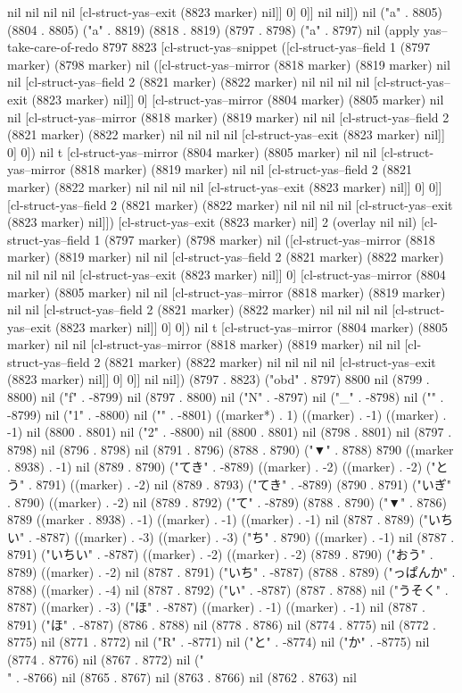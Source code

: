 nil nil nil nil [cl-struct-yas--exit (8823 marker) nil]] 0] 0]] nil nil]) nil ("a" . 8805) (8804 . 8805) ("a" . 8819) (8818 . 8819) (8797 . 8798) ("a" . 8797) nil (apply yas--take-care-of-redo 8797 8823 [cl-struct-yas--snippet ([cl-struct-yas--field 1 (8797 marker) (8798 marker) nil ([cl-struct-yas--mirror (8818 marker) (8819 marker) nil nil [cl-struct-yas--field 2 (8821 marker) (8822 marker) nil nil nil nil [cl-struct-yas--exit (8823 marker) nil]] 0] [cl-struct-yas--mirror (8804 marker) (8805 marker) nil nil [cl-struct-yas--mirror (8818 marker) (8819 marker) nil nil [cl-struct-yas--field 2 (8821 marker) (8822 marker) nil nil nil nil [cl-struct-yas--exit (8823 marker) nil]] 0] 0]) nil t [cl-struct-yas--mirror (8804 marker) (8805 marker) nil nil [cl-struct-yas--mirror (8818 marker) (8819 marker) nil nil [cl-struct-yas--field 2 (8821 marker) (8822 marker) nil nil nil nil [cl-struct-yas--exit (8823 marker) nil]] 0] 0]] [cl-struct-yas--field 2 (8821 marker) (8822 marker) nil nil nil nil [cl-struct-yas--exit (8823 marker) nil]]) [cl-struct-yas--exit (8823 marker) nil] 2 (overlay nil nil) [cl-struct-yas--field 1 (8797 marker) (8798 marker) nil ([cl-struct-yas--mirror (8818 marker) (8819 marker) nil nil [cl-struct-yas--field 2 (8821 marker) (8822 marker) nil nil nil nil [cl-struct-yas--exit (8823 marker) nil]] 0] [cl-struct-yas--mirror (8804 marker) (8805 marker) nil nil [cl-struct-yas--mirror (8818 marker) (8819 marker) nil nil [cl-struct-yas--field 2 (8821 marker) (8822 marker) nil nil nil nil [cl-struct-yas--exit (8823 marker) nil]] 0] 0]) nil t [cl-struct-yas--mirror (8804 marker) (8805 marker) nil nil [cl-struct-yas--mirror (8818 marker) (8819 marker) nil nil [cl-struct-yas--field 2 (8821 marker) (8822 marker) nil nil nil nil [cl-struct-yas--exit (8823 marker) nil]] 0] 0]] nil nil]) (8797 . 8823) ("obd" . 8797) 8800 nil (8799 . 8800) nil ("f" . -8799) nil (8797 . 8800) nil ("N" . -8797) nil ("_" . -8798) nil ("{" . -8799) nil ("1" . -8800) nil ("}" . -8801) ((marker*) . 1) ((marker) . -1) ((marker) . -1) nil (8800 . 8801) nil ("2" . -8800) nil (8800 . 8801) nil (8798 . 8801) nil (8797 . 8798) nil (8796 . 8798) nil (8791 . 8796) (8788 . 8790) ("▼" . 8788) 8790 ((marker . 8938) . -1) nil (8789 . 8790) ("てき" . -8789) ((marker) . -2) ((marker) . -2) ("とう" . 8791) ((marker) . -2) nil (8789 . 8793) ("てき" . -8789) (8790 . 8791) ("いぎ" . 8790) ((marker) . -2) nil (8789 . 8792) ("て" . -8789) (8788 . 8790) ("▼" . 8786) 8789 ((marker . 8938) . -1) ((marker) . -1) ((marker) . -1) nil (8787 . 8789) ("いちい" . -8787) ((marker) . -3) ((marker) . -3) ("ち" . 8790) ((marker) . -1) nil (8787 . 8791) ("いちい" . -8787) ((marker) . -2) ((marker) . -2) (8789 . 8790) ("おう" . 8789) ((marker) . -2) nil (8787 . 8791) ("いち" . -8787) (8788 . 8789) ("っぱんか" . 8788) ((marker) . -4) nil (8787 . 8792) ("い" . -8787) (8787 . 8788) nil ("うそく" . 8787) ((marker) . -3) ("ほ" . -8787) ((marker) . -1) ((marker) . -1) nil (8787 . 8791) ("ほ" . -8787) (8786 . 8788) nil (8778 . 8786) nil (8774 . 8775) nil (8772 . 8775) nil (8771 . 8772) nil ("R" . -8771) nil ("と" . -8774) nil ("か" . -8775) nil (8774 . 8776) nil (8767 . 8772) nil ("\\" . -8766) nil (8765 . 8767) nil (8763 . 8766) nil (8762 . 8763) nil 
